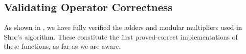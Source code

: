 \subsection{Validating Operator Correctness}

As shown in , we have fully verified the
adders and modular multipliers used in Shor's
algorithm. These constitute the first proved-correct implementations
of these functions, as far as we are aware. 





